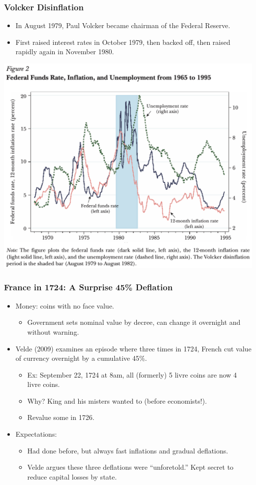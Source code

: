 \documentclass[english,xcolor=svgnames]{beamer}
\begin{document}
\begin{frame}
\frametitle{Volcker Disinflation}
\begin{itemize}
	\item In August 1979, Paul Volcker became chairman of the Federal Reserve. 
	\item First raised interest rates in October 1979, then backed off, then raised rapidly again in November 1980.
\end{itemize}
\centering
\includegraphics[scale=0.4]{../../Images/NS2018volcker.png}	

\end{frame}


\begin{frame}
\frametitle{France in 1724: A Surprise 45\% Deflation}
\begin{itemize}
	\item Money: coins with no face value.
	\begin{itemize}
		\item Government sets nominal value by decree, can change it
overnight and without warning.
	\end{itemize}
	\item Velde (2009) examines an episode where three times in 1724, French cut value of currency overnight by a cumulative 45\%.
	\begin{itemize}
		\item Ex: September 22, 1724 at 8am, all (formerly) 5 livre coins are now 4 livre coins.
		\item Why? King and his misters wanted to (before economists!).
		\item Revalue some in 1726.
	\end{itemize}
	\item Expectations:
	\begin{itemize}
		\item Had done before, but always fast inflations and gradual deflations.
		\item Velde argues these three deflations were ``unforetold.'' Kept secret to reduce capital losses by state.
	\end{itemize}
\end{itemize}
\end{frame}
\end{document}
